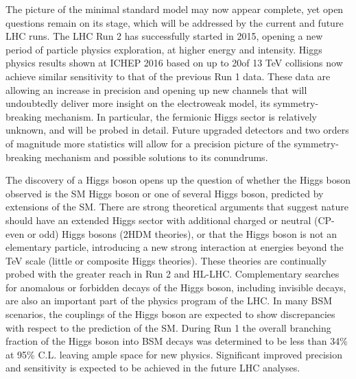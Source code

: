 \noindent The picture of the minimal standard model may now appear complete,
yet open questions remain on its stage, which will be addressed by the
current and future LHC runs. The LHC Run 2 has successfully started in
2015, opening a new period of particle physics exploration, at higher
energy and intensity. Higgs physics results shown at ICHEP 2016 based on
up to 20\fb of 13 TeV collisions now achieve similar sensitivity to
that of the previous Run 1 data. These data are allowing an increase in
precision and opening up new channels that will undoubtedly deliver more
insight on the electroweak model, its symmetry-breaking mechanism. In
particular, the fermionic Higgs sector is relatively unknown, and will
be probed in detail. Future upgraded detectors and two orders of
magnitude more statistics will allow for a precision picture of the
symmetry-breaking mechanism and possible solutions to its conundrums.
\medskip

\noindent The discovery of a Higgs boson opens up the question of whether the
Higgs boson observed is the SM Higgs boson or one of several Higgs
boson, predicted by extensions of the SM. There are strong theoretical
arguments that suggest nature should have an extended Higgs sector with
additional charged or neutral (CP-even or odd) Higgs bosons (2HDM
theories), or that the Higgs boson is not an elementary particle,
introducing a new strong interaction at energies beyond the TeV scale
(little or composite Higgs theories). These theories are continually
probed with the greater reach in Run 2 and HL-LHC. Complementary
searches for anomalous or forbidden decays of the Higgs boson, including
invisible decays, are also an important part of the physics program of
the LHC. In many BSM scenarios, the couplings of the Higgs boson are
expected to show discrepancies with respect to the prediction of the SM.
During Run 1 the overall branching fraction of the Higgs boson into BSM
decays was determined to be less than 34\% at 95\% C.L. leaving ample
space for new physics. Significant improved precision and sensitivity is
expected to be achieved in the future LHC analyses.